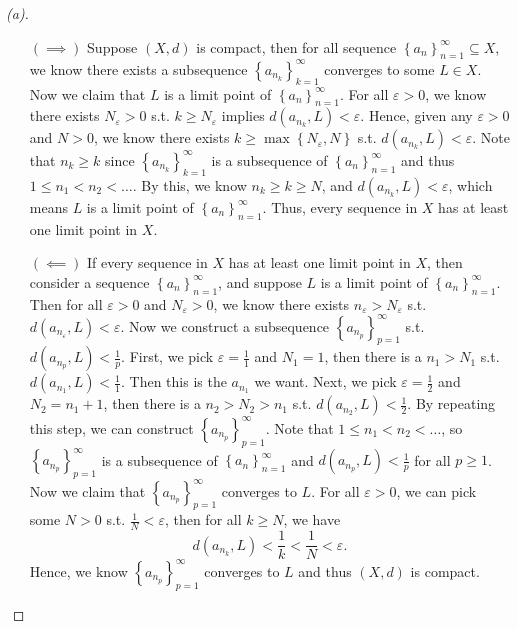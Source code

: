 \begin{proof}[(a)]
  \vphantom{text}
  \begin{itemize}
    \item [\((\implies )\)] Suppose \((X, d)\) is compact, then for all sequence \(\left\{ a_n \right\}_{n=1}^{\infty} \subseteq X \), we know there exists a subsequence \(\left\{ a_{n_k} \right\}_{k=1}^{\infty}  \) converges to some \(L \in X\). Now we claim that \(L\) is a limit point of \(\left\{ a_n \right\}_{n=1}^{\infty}  \). For all \(\varepsilon > 0\), we know there exists \(N_{\varepsilon } > 0\) s.t. \(k \ge N_{\varepsilon }\) implies \(d \left( a_{n_k}, L \right) < \varepsilon  \). Hence, given any \(\varepsilon > 0\) and \(N > 0\), we know there exists \(k \ge \max \left\{ N_{\varepsilon }, N  \right\} \) s.t. \(d \left( a_{n_k}, L \right) < \varepsilon  \). Note that \(n_k \ge k\)  since \(\left\{ a_{n_k} \right\}_{k=1}^{\infty}  \) is a subsequence of \(\left\{ a_n \right\}_{n=1}^{\infty}  \) and thus \(1 \le n_1 < n_2 < \dots \). By this, we know \(n_k \ge k \ge N\), and \(d \left( a_{n_k}, L \right) < \varepsilon  \), which means \(L\) is a limit point of \(\left\{ a_n \right\}_{n=1}^{\infty}  \). Thus, every sequence in \(X\) has at least one limit point in \(X\).                      
    \item [\((\impliedby )\)] If every sequence in \(X\) has at least one limit point in \(X\), then consider a sequence \(\left\{ a_n \right\}_{n=1}^{\infty}  \), and suppose \(L\) is a limit point of \(\left\{ a_n \right\}_{n=1}^{\infty}  \). Then for all \(\varepsilon > 0\) and \(N_{\varepsilon } > 0 \), we know there exists \(n_{\varepsilon } > N_{\varepsilon }\) s.t. \(d\left( a_{n_{\varepsilon }}, L \right) < \varepsilon \). Now we construct a subsequence \(\left\{ a_{n_p} \right\}_{p=1}^{\infty}  \) s.t. \(d\left( a_{n_p}, L \right) < \frac{1}{p} \). First, we pick \(\varepsilon = \frac{1}{1}\) and \(N_{1 } = 1 \), then there is a \(n_1 > N_{1} \) s.t. \(d\left( a_{n_1}, L \right) < \frac{1}{1} \). Then this is the \(a_{n_1} \) we want. Next, we pick \(\varepsilon = \frac{1}{2}\) and \(N_2 = n_1 + 1\), then there is a \(n_2 > N_2 > n_1\) s.t. \(d \left( a_{n_2}, L \right) < \frac{1}{2} \). By repeating this step, we can construct \(\left\{ a_{n_p} \right\}_{p=1}^{\infty}  \). Note that \(1 \le n_1 < n_2 < \dots \), so \(\left\{ a_{n_p} \right\}_{p=1}^{\infty}  \) is a subsequence of \(\left\{ a_{n} \right\}_{n=1}^{\infty}  \) and \(d\left( a_{n_p}, L \right) < \frac{1}{p}\) for all \(p \ge 1\). Now we claim that \(\left\{ a_{n_p} \right\}_{p=1}^{\infty}  \) converges to \(L\). For all \(\varepsilon > 0\), we can pick some \(N > 0\) s.t. \(\frac{1}{N} < \varepsilon \), then for all \(k \ge N\), we have 
    \[
      d \left( a_{n_k}, L \right) < \frac{1}{k} < \frac{1}{N} < \varepsilon.
    \]
    Hence, we know \(\left\{ a_{n_p} \right\}_{p=1}^{\infty}  \) converges to \(L\) and thus \((X, d)\) is compact.   
  \end{itemize}
\end{proof}
